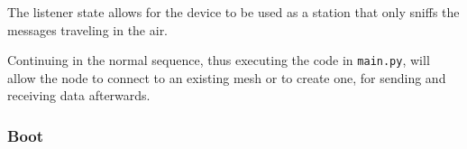 				The listener state allows for the device to be used as a station that only sniffs the messages traveling in the air.
				
				Continuing in the normal sequence, thus executing the code in \texttt{main.py}, will allow the node to connect to an existing mesh or to create one, for sending and receiving data afterwards.
			
			
%					
%					
			
			\newpage
			\subsubsection{Boot}
			
